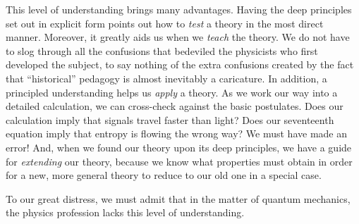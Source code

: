 \documentclass[aps,pra,superscriptaddress,10pt,tightenlines,twocolumn,nofootinbib]{revtex4}
\begin{document}
This level of understanding brings many advantages.  Having the deep principles set out in explicit form points out how to {\it test\/} a theory in the most direct manner.  Moreover, it greatly aids us when we {\it teach\/} the theory.  We do not have to slog through all the confusions that bedeviled the physicists who first developed the subject, to say nothing of the extra confusions created by the fact that ``historical'' pedagogy is almost inevitably a caricature.  In addition, a principled understanding helps us {\it apply\/} a theory.  As we work our way into a detailed calculation, we can cross-check against the basic postulates.  Does our calculation imply that signals travel faster than light?  Does our seventeenth equation imply that entropy is flowing the wrong way?  We must have made an error!  And, when we found our theory upon its deep principles, we have a guide for {\it extending\/} our theory, because we know what properties must obtain in order for a new, more general theory to reduce to our old one in a special case.

To our great distress, we must admit that in the matter of quantum mechanics, the physics profession lacks this level of understanding.
\end{document}
